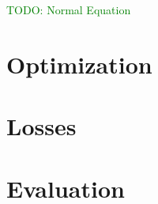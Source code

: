 \textcolor{green}{TODO: Normal Equation}





\chapter{Optimization}



\chapter{Losses}






\chapter{Evaluation}










